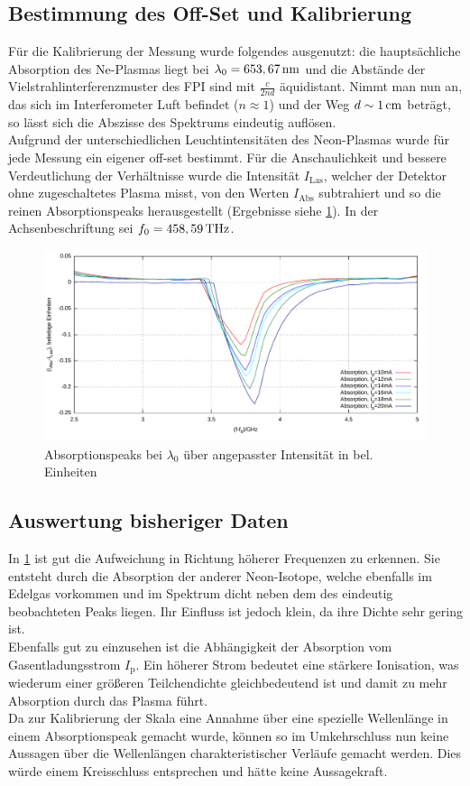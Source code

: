 \documentclass[numbers=noenddot,12pt,a4paper]{scrartcl}
\newcommand{\ix}[1]{_\text{#1}}
\begin{document}
\subsection{Bestimmung des Off-Set und Kalibrierung}
Für die Kalibrierung der Messung wurde folgendes ausgenutzt: die hauptsächliche Absorption des Ne-Plasmas liegt bei $\lambda\ix{0}=\unit[653,67]{nm}$ und die Abstände der Vielstrahlinterferenzmuster des FPI sind mit $\frac{c}{2nd}$ äquidistant. Nimmt man nun an, das sich im Interferometer Luft befindet ($n\approx1$) und der Weg $d\sim\unit[1]{cm}$ beträgt, so lässt sich die Abszisse des Spektrums eindeutig auflösen.\\
Aufgrund der unterschiedlichen Leuchtintensitäten des Neon-Plasmas wurde für jede Messung ein eigener off-set bestimmt. Für die Anschaulichkeit und bessere Verdeutlichung der Verhältnisse wurde die Intensität $I\ix{Las}$, welcher der Detektor ohne zugeschaltetes Plasma misst, von den Werten $I\ix{Abs}$ subtrahiert und so die reinen Absorptionspeaks herausgestellt (Ergebnisse siehe \ref{img:ergeb}). In der Achsenbeschriftung sei $f\ix{0}=\unit[458,59]{THz}$.
\begin{figure}[H]
	\centering
	\includegraphics[width=\textwidth]{messwerte/datenohneoffset.pdf}
	\caption{Absorptionspeaks bei $\lambda\ix{0}$ über angepasster Intensität in bel. Einheiten}\label{img:ergeb}
\end{figure}
\subsection{Auswertung bisheriger Daten}
In \ref{img:ergeb} ist gut die Aufweichung in Richtung höherer Frequenzen zu erkennen. Sie entsteht durch die Absorption der anderer Neon-Isotope, welche ebenfalls im Edelgas vorkommen und im Spektrum dicht neben dem des eindeutig beobachteten Peaks liegen. Ihr Einfluss ist jedoch klein, da ihre Dichte sehr gering ist.\\
Ebenfalls gut zu einzusehen ist die Abhängigkeit der Absorption vom Gasentladungsstrom $I\ix{p}$. Ein höherer Strom bedeutet eine stärkere Ionisation, was wiederum einer größeren Teilchendichte gleichbedeutend ist und damit zu mehr Absorption durch das Plasma führt.\\
Da zur Kalibrierung der Skala eine Annahme über eine spezielle Wellenlänge in einem Absorptionspeak gemacht wurde, können so im Umkehrschluss nun keine Aussagen über die Wellenlängen charakteristischer Verläufe gemacht werden. Dies würde einem Kreisschluss entsprechen und hätte keine Aussagekraft.
\end{document}
